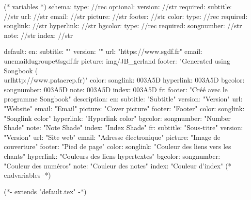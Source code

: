 
(* variables *)
schema:
  type: //rec
  optional:
    version: //str
  required:
    subtitle: //str
    url: //str
    email: //str
    picture: //str
    footer: //str
    color:
      type: //rec
      required:
        songlink: //str
        hyperlink: //str
    bgcolor:
      type: //rec
      required:
        songnumber: //str
        note: //str
        index: //str

default:
  en:
    subtitle: ""
    version: ""
    url: "https://www.sgdf.fr"
    email: unemaildugroupe@sgdf.fr
    picture: img/JB_gerland
    footer: "Generated using Songbook (\\url{http://www.patacrep.fr})"
    color:
      songlink: 003A5D
      hyperlink: 003A5D
    bgcolor:
      songnumber: 003A5D
      note: 003A5D
      index: 003A5D
  fr: {footer: "Créé avec le programme Songbook"}
description:
  en:
    subtitle: "Subtitle"
    version: "Version"
    url: "Website"
    email: "Email"
    picture: "Cover picture"
    footer: "Footer"
    color:
      songlink: "Songlink color"
      hyperlink: "Hyperlink color"
    bgcolor:
      songnumber: "Number Shade"
      note: "Note Shade"
      index: "Index Shade"
  fr:
    subtitle: "Sous-titre"
    version: "Version"
    url: "Site web"
    email: "Adresse électronique"
    picture: "Image de couverture"
    footer: "Pied de page"
    color:
      songlink: "Couleur des liens vers les chants"
      hyperlink: "Couleurs des liens hypertextes"
    bgcolor:
      songnumber: "Couleur des numéros"
      note: "Couleur des notes"
      index: "Couleur d'index"
(* endvariables -*)

(*- extends "default.tex" -*)

